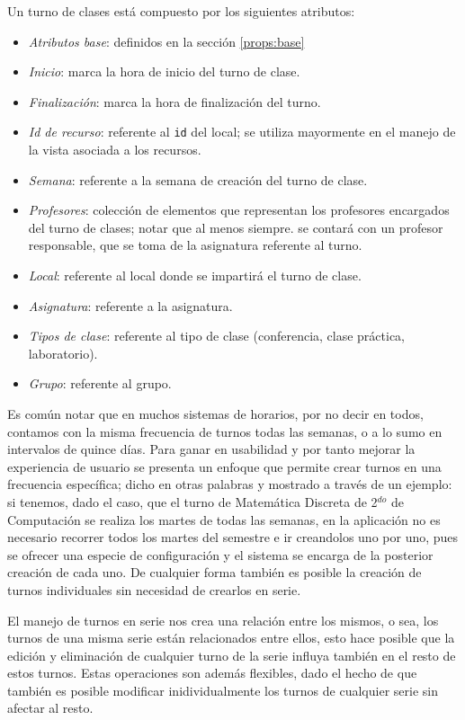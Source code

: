 Un turno de clases está compuesto por los siguientes atributos:
\begin{itemize}
	\item \textit{Atributos base}: definidos en la sección \ref{props:base}
	\item \textit{Inicio}: marca la hora de inicio del turno de clase.
	\item \textit{Finalización}: marca la hora de finalización del turno.
	\item \textit{Id de recurso}: referente al \texttt{id} del local; se utiliza mayormente en el manejo de la vista asociada a los recursos.
	\item \textit{Semana}: referente a la semana de creación del turno de clase.
	\item \textit{Profesores}: colección de elementos que representan los profesores encargados del turno de clases; notar que al menos siempre. se contará con un profesor responsable, que se toma de la asignatura referente al turno.\item \textit{Local}: referente al local donde se impartirá el turno de clase.
	\item \textit{Asignatura}: referente a la asignatura.
	\item \textit{Tipos de clase}: referente al tipo de clase (conferencia, clase práctica, laboratorio).
	\item \textit{Grupo}: referente al grupo.
\end{itemize}

Es común notar que en muchos sistemas de horarios, por no decir en todos, contamos con la misma frecuencia de turnos todas las semanas, o a lo sumo en intervalos de quince días. Para ganar en usabilidad y por tanto mejorar la experiencia de usuario se presenta un enfoque que permite crear turnos en una frecuencia específica; dicho en otras palabras y mostrado a través de un ejemplo: si tenemos, dado el caso, que el turno de Matemática Discreta de 2$^{do}$ de Computación se realiza los martes de todas las semanas, en la aplicación no es necesario recorrer todos los martes del semestre e ir creandolos uno por uno, pues se ofrecer una especie de configuración y el sistema se encarga de la posterior creación de cada uno. De cualquier forma también  es posible la creación de turnos individuales sin necesidad de crearlos en serie.

El manejo de turnos en serie nos crea una relación entre los mismos, o sea, los turnos de una misma serie están relacionados entre ellos, esto hace posible que la edición y eliminación de cualquier turno de la serie influya también en el resto de estos turnos. Estas operaciones son además flexibles, dado el hecho de que también es posible modificar inidividualmente los turnos de cualquier serie sin afectar al resto.


